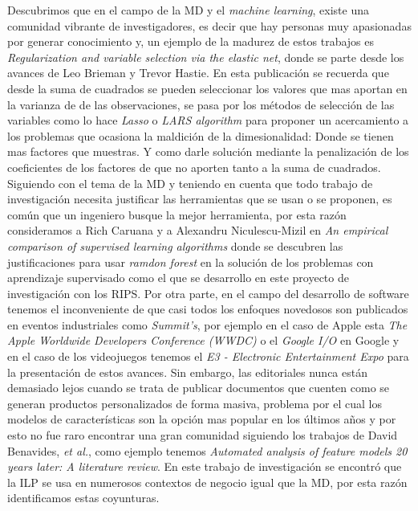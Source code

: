 Descubrimos que en el campo de la MD y el \textit{machine learning}, existe una comunidad vibrante de investigadores, es decir que hay personas muy apasionadas por generar conocimiento y, un ejemplo de la madurez de estos trabajos es \textit{Regularization and variable selection via the elastic net}\cite{Zou2005a}, donde se parte desde los avances de Leo Brieman y Trevor Hastie. En esta publicación se recuerda que desde la suma de cuadrados se pueden seleccionar los valores que mas aportan en la varianza de de las observaciones, se pasa por los métodos de selección de las variables como lo hace  \textit{Lasso} o \textit{LARS algorithm} para proponer  un acercamiento a los problemas que ocasiona la maldición de la dimesionalidad: Donde se tienen mas factores que muestras. Y como darle solución mediante la  penalización de los coeficientes de los factores de que no aporten tanto a la suma de cuadrados. 
Siguiendo con el tema de la MD y teniendo en cuenta que  todo trabajo de investigación necesita justificar las herramientas que se usan o se proponen, es común que un ingeniero busque la mejor herramienta, por esta razón consideramos a Rich Caruana y a Alexandru Niculescu-Mizil en \textit{An empirical comparison of supervised learning algorithms}\cite{Caruana2006}  donde se descubren las justificaciones para usar \textit{ramdon forest} en la solución de los problemas con aprendizaje supervisado como el que se desarrollo en este proyecto de investigación con los RIPS.
Por otra parte,  en el campo del desarrollo de software tenemos el inconveniente de que casi todos los enfoques novedosos son publicados en eventos industriales como \textit{Summit's}, por ejemplo en el caso de Apple esta \textit{The Apple Worldwide Developers Conference (WWDC)} o el \textit{Google I/O} en Google y en el caso de los videojuegos tenemos  el \textit{E3 - Electronic Entertainment Expo} para la presentación de estos avances. Sin embargo, las editoriales nunca están demasiado lejos cuando se trata de publicar documentos que cuenten como se generan productos personalizados de forma masiva, problema por el cual los modelos de características son la opción mas popular en los últimos años y por esto no fue raro encontrar una gran comunidad siguiendo los trabajos de David Benavides, \textit{et al.}, como ejemplo tenemos \textit{Automated analysis of feature models 20 years later: A literature review}\cite{Benavides2010}.
En este trabajo de investigación se encontró que la ILP se usa en numerosos contextos de negocio igual que la MD, por esta razón identificamos estas coyunturas.
